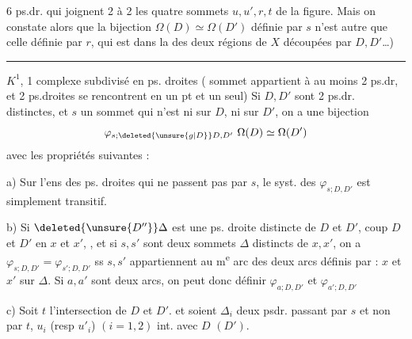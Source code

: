 6 ps.dr. qui joignent 2 à 2 les quatre sommets
$u,u',r,t$ de la figure. Mais on constate alors que
la bijection  $\Omega(D)\simeq\Omega(D')$ définie par $s$ n'est autre
que celle définie par $r$, qui est dans la 
des deux régions de $X$ découpées par $D,D'$\ldots)

\begin{center}\rule{1cm}{.3pt}\end{center}

$K^1$, 1 complexe subdivisé en ps. droites ( sommet
appartient à au moins 2 ps.dr, et 2 ps.droites se rencontrent en un pt et un seul)
Si $D,D'$ sont 2 ps.dr. distinctes, et $s$ un sommet
qui n'est ni sur $D$, ni sur $D'$, on a une bijection
\[
\varphi_{s;\deleted{\unsure{g|D}}D,D'}\ \Omega(D)\simeq\Omega(D')
\]
avec les propriétés suivantes :

a) Sur l'ens des ps. droites  qui ne passent pas
par $s$,  le syst. des $\varphi_{s;D,D'}$ est simplement transitif.

b) Si $\deleted{\unsure{D''}}\Delta$ est une ps. droite distincte de $D$ et $D'$,
coup $D$ et $D'$ en $x$ et $x'$, , et si $s,s'$ sont deux
sommets  $\Delta$ distincts de $x,x'$,  
 on a $\varphi_{s;D,D'}=\varphi_{s';D,D'}$ ss $s,s'$
appartiennent au m\textsuperscript{e} arc des deux arcs définis par :
$x$ et $x'$ sur $\Delta$. Si $a,a'$ sont  deux arcs,
on peut donc définir $\varphi_{a;D,D'}$ et $\varphi_{a';D,D'}$

c) Soit $t$  l'intersection de $D$ et $D'$.
et soient $\Delta_i$   deux psdr. passant par $s$ et non par
$t$,  $u_i$ (resp $u'_i$) $(i=1,2)$  int. avec $D$ $(D')$.

